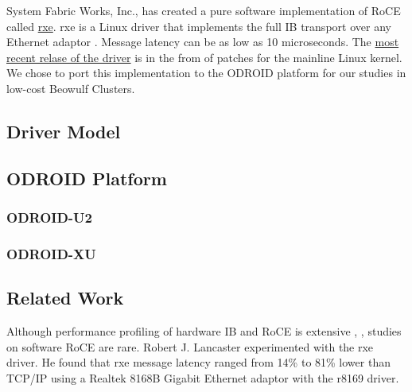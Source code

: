 \documentclass[a4paper]{article}
\begin{document}

System Fabric Works, Inc., has created a pure software implementation of RoCE
called \href{http://www.systemfabricworks.com/downloads/roce}{rxe}. rxe is a
Linux driver that implements the full IB transport over any Ethernet adaptor
\cite{pearson-10}. Message latency can be as low as 10
microseconds\cite{pearson-10}. The
\href{http://support.systemfabricworks.com/downloads/rxe/}{most recent relase of
the driver} is in the from of patches for the mainline Linux kernel. We chose
to port this implementation to the ODROID platform for our studies in low-cost
Beowulf Clusters.

\subsection{\textbf{Driver Model}}


\subsection{\textbf{ODROID Platform}}

\subsubsection{\textbf{ODROID-U2}}

\subsubsection{\textbf{ODROID-XU}}

\subsection{\textbf{Related Work}}


Although performance profiling of hardware IB and RoCE is extensive
\cite{subamaroni-09}, \cite{vienne-12}, studies on software RoCE are
rare. Robert J. Lancaster \cite{lancaster-10} experimented with the rxe
driver. He found that rxe message latency ranged from 14\% to 81\% lower than
TCP/IP using a Realtek 8168B Gigabit Ethernet adaptor with the r8169 driver.






\end{document}
